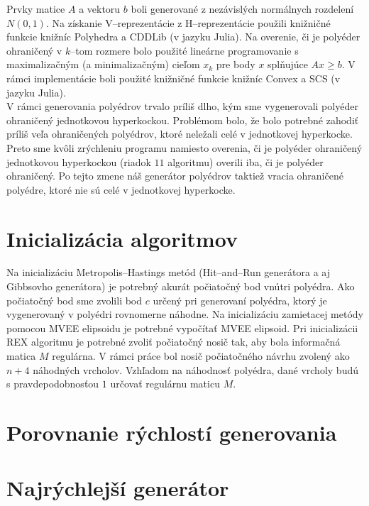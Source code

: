 Prvky matice $A$ a vektoru $b$ boli generované z nezávislých normálnych rozdelení $N(0,1)$. Na získanie V--reprezentácie z H--reprezentácie použili knižničné funkcie knižníc Polyhedra a CDDLib (v jazyku Julia). Na overenie, či je polyéder ohraničený v $k$--tom rozmere bolo použité lineárne programovanie s maximalizačným (a minimalizačným) cieľom $x_k$ pre body $x$ splňujúce $Ax \geq b$. V rámci implementácie boli použité knižničné funkcie knižníc Convex a SCS (v jazyku Julia).\\

V rámci generovania polyédrov trvalo príliš dlho, kým sme vygenerovali polyéder ohraničený jednotkovou hyperkockou. Problémom bolo, že bolo potrebné zahodiť príliš veľa ohraničených polyédrov, ktoré neležali celé v jednotkovej hyperkocke. Preto sme kvôli zrýchleniu programu namiesto overenia, či je polyéder ohraničený jednotkovou hyperkockou (riadok $11$ algoritmu) overili iba, či je polyéder ohraničený.
Po tejto zmene náš generátor polyédrov taktiež vracia ohraničené polyédre, ktoré nie sú celé v jednotkovej hyperkocke. \\


\section{Inicializácia algoritmov}

Na inicializáciu Metropolis--Hastings metód (Hit--and--Run generátora a aj Gibbsovho generátora) je potrebný akurát počiatočný bod vnútri polyédra. Ako počiatočný bod sme zvolili bod $c$ určený pri generovaní polyédra, ktorý je vygenerovaný v polyédri rovnomerne náhodne.
Na inicializáciu zamietacej metódy pomocou MVEE elipsoidu je potrebné vypočítať MVEE elipsoid. Pri inicializácii REX algoritmu je potrebné zvoliť počiatočný nosič tak, aby bola informačná matica $M$ regulárna. V rámci práce bol nosič počiatočného návrhu zvolený ako $n+4$ náhodných vrcholov. Vzhľadom na náhodnosť polyédra, dané vrcholy budú s pravdepodobnosťou $1$ určovať regulárnu maticu $M$.

\section{Porovnanie rýchlostí generovania}

\section{Najrýchlejší generátor}